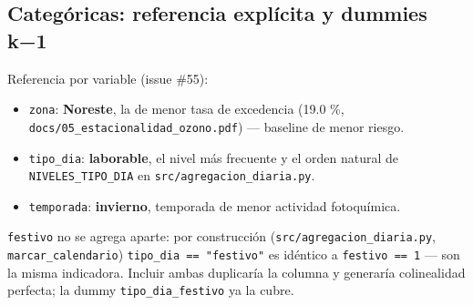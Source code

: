 \documentclass[
  spanish,
  letterpaper,
  DIV=11,
  numbers=noendperiod]{scrartcl}
\providecommand{\tightlist}{%
  \setlength{\itemsep}{0pt}\setlength{\parskip}{0pt}}
\begin{document}
\subsection{Categóricas: referencia explícita y dummies
k−1}\label{categuxf3ricas-referencia-expluxedcita-y-dummies-k1}

Referencia por variable (issue \#55):

\begin{itemize}
\tightlist
\item
  \texttt{zona}: \textbf{Noreste}, la de menor tasa de excedencia (19.0
  \%, \texttt{docs/05\_estacionalidad\_ozono.pdf}) --- baseline de menor
  riesgo.
\item
  \texttt{tipo\_dia}: \textbf{laborable}, el nivel más frecuente y el
  orden natural de \texttt{NIVELES\_TIPO\_DIA} en
  \texttt{src/agregacion\_diaria.py}.
\item
  \texttt{temporada}: \textbf{invierno}, temporada de menor actividad
  fotoquímica.
\end{itemize}

\texttt{festivo} no se agrega aparte: por construcción
(\texttt{src/agregacion\_diaria.py}, \texttt{marcar\_calendario})
\texttt{tipo\_dia\ ==\ "festivo"} es idéntico a \texttt{festivo\ ==\ 1}
--- son la misma indicadora. Incluir ambas duplicaría la columna y
generaría colinealidad perfecta; la dummy \texttt{tipo\_dia\_festivo} ya
la cubre.
\end{document}
